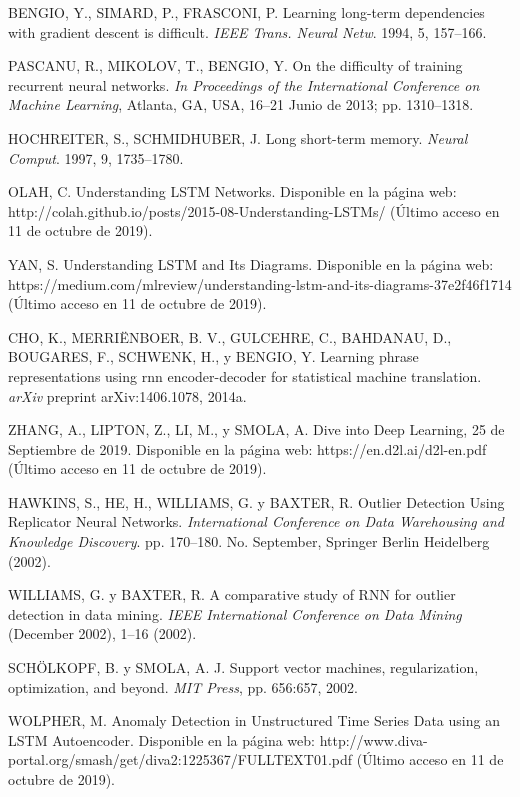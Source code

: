 \begin{thebibliography}{9}
 BENGIO, Y., SIMARD, P., FRASCONI, P. Learning long-term dependencies with gradient descent is difficult. \textit{IEEE Trans. Neural Netw}. 1994, 5, 157–166.

 PASCANU, R., MIKOLOV, T., BENGIO, Y. On the difficulty of training recurrent neural networks. \textit{In Proceedings of the International Conference on Machine Learning}, Atlanta, GA, USA, 16–21 Junio de 2013; pp. 1310–1318.

 HOCHREITER, S., SCHMIDHUBER, J. Long short-term memory. \textit{Neural Comput}. 1997, 9, 1735–1780.

 OLAH, C. Understanding LSTM Networks. Disponible en la p\'{a}gina web: http://colah.github.io/posts/2015-08-Understanding-LSTMs/ (\'{U}ltimo acceso en 11 de octubre de 2019).

 YAN, S. Understanding LSTM and Its Diagrams. Disponible en la p\'{a}gina web: https://medium.com/mlreview/understanding-lstm-and-its-diagrams-37e2f46f1714 (\'{U}ltimo acceso en 11 de octubre de 2019).

 CHO, K., MERRI\"{E}NBOER, B. V., GULCEHRE, C., BAHDANAU, D., BOUGARES, F., SCHWENK, H., y BENGIO, Y. Learning phrase representations using rnn encoder-decoder for statistical machine translation. \textit{arXiv} preprint arXiv:1406.1078, 2014a.

 ZHANG, A., LIPTON, Z., LI, M., y SMOLA, A. Dive into Deep Learning, 25 de Septiembre de 2019. Disponible en la p\'{a}gina web: https://en.d2l.ai/d2l-en.pdf (\'{U}ltimo acceso en 11 de octubre de 2019).

 HAWKINS, S., HE, H., WILLIAMS, G. y BAXTER, R. Outlier Detection Using Replicator Neural Networks. \textit{International Conference on Data Warehousing and Knowledge Discovery}. pp. 170–180. No. September, Springer Berlin Heidelberg (2002).

  WILLIAMS, G. y BAXTER, R. A comparative study of RNN for outlier detection in data mining. \textit{IEEE International Conference on Data Mining} (December 2002), 1–16 (2002).

 SCH\"{O}LKOPF, B. y SMOLA, A. J. Support vector machines, regularization, optimization, and beyond. \textit{MIT Press}, pp. 656:657, 2002.

 WOLPHER, M. Anomaly Detection in Unstructured Time Series Data using an LSTM Autoencoder. Disponible en la p\'{a}gina web: http://www.diva-portal.org/smash/get/diva2:1225367/FULLTEXT01.pdf (\'{U}ltimo acceso en 11 de octubre de 2019).


\end{thebibliography}
